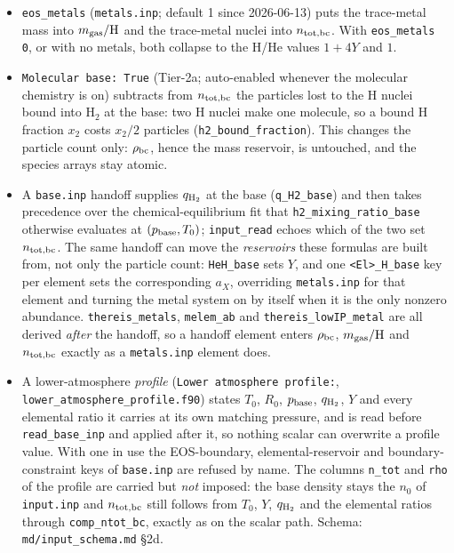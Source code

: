 \documentclass[english,a4paper]{my_memo}
\begin{document}
\begin{itemize}
\item \texttt{eos\_metals} (\texttt{metals.inp}; default 1 since
  2026-06-13) puts the trace-metal mass into $m_{\rm gas}/{\rm H}$ and
  the trace-metal nuclei into $n_{\rm tot,bc}$. With
  \texttt{eos\_metals 0}, or with no metals, both collapse to the H/He
  values $1+4Y$ and $1$.
\item \texttt{Molecular base: True} (Tier-2a; auto-enabled whenever the
  molecular chemistry is on) subtracts from $n_{\rm tot,bc}$ the
  particles lost to the H nuclei bound into H$_2$ at the base: two H
  nuclei make one molecule, so a bound H fraction $x_2$ costs $x_2/2$
  particles (\texttt{h2\_bound\_fraction}). This changes the particle
  count only: $\rho_{\rm bc}$, hence the mass reservoir, is untouched,
  and the species arrays stay atomic.
\item A \texttt{base.inp} handoff supplies $q_{\rm H_2}$ at the base
  (\texttt{q\_H2\_base}) and then takes precedence over the
  chemical-equilibrium fit that \texttt{h2\_mixing\_ratio\_base}
  otherwise evaluates at $(p_{\rm base}, T_0)$; \texttt{input\_read}
  echoes which of the two set $n_{\rm tot,bc}$. The same handoff can move
  the \emph{reservoirs} these formulas are built from, not only the
  particle count: \texttt{HeH\_base} sets $Y$, and one
  \texttt{<El>\_H\_base} key per element sets the corresponding $a_X$,
  overriding \texttt{metals.inp} for that element and turning the metal
  system on by itself when it is the only nonzero abundance.
  \texttt{thereis\_metals}, \texttt{melem\_ab} and
  \texttt{thereis\_lowIP\_metal} are all derived \emph{after} the handoff,
  so a handoff element enters $\rho_{\rm bc}$, $m_{\rm gas}/{\rm H}$ and
  $n_{\rm tot,bc}$ exactly as a \texttt{metals.inp} element does.
\item A lower-atmosphere \emph{profile} (\texttt{Lower atmosphere
  profile:}, \texttt{lower\_atmosphere\_profile.f90}) states $T_0$, $R_0$,
  $p_{\rm base}$, $q_{\rm H_2}$, $Y$ and every elemental ratio it carries
  at its own matching pressure, and is read before \texttt{read\_base\_inp}
  and applied after it, so nothing scalar can overwrite a profile value.
  With one in use the EOS-boundary, elemental-reservoir and
  boundary-constraint keys of \texttt{base.inp} are refused by name. The
  columns \texttt{n\_tot} and \texttt{rho} of the profile are carried but
  \emph{not} imposed: the base density stays the $n_0$ of
  \texttt{input.inp} and $n_{\rm tot,bc}$ still follows from
  $T_0$, $Y$, $q_{\rm H_2}$ and the elemental ratios through
  \texttt{comp\_ntot\_bc}, exactly as on the scalar path. Schema:
  \texttt{md/input\_schema.md} \S2d.
\end{itemize}
\end{document}
